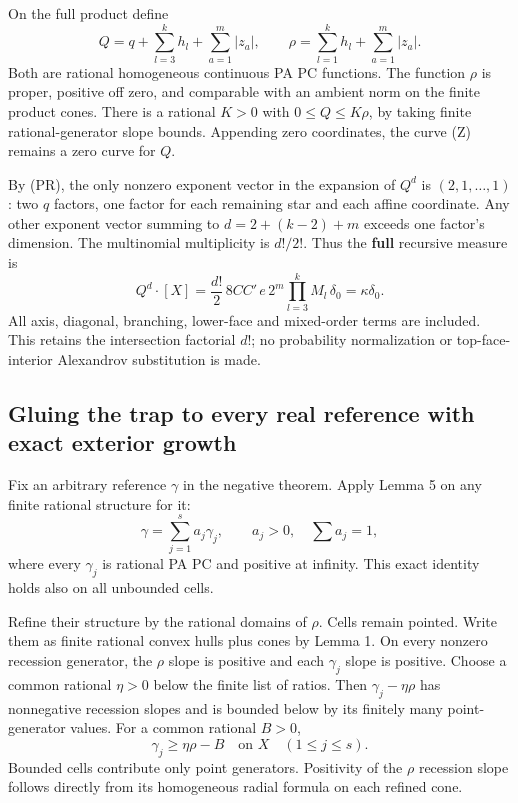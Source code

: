 \documentclass[
  11pt,
]{article}
\begin{document}
On the full product define \[
Q=q+\sum_{l=3}^kh_l+\sum_{a=1}^m|z_a|,
\qquad \rho=\sum_{l=1}^kh_l+\sum_{a=1}^m|z_a|.
\tag{Q}
\] Both are rational homogeneous continuous PA PC functions. The
function \(\rho\) is proper, positive off zero, and comparable with an
ambient norm on the finite product cones. There is a rational \(K>0\)
with \(0\leq Q\leq K\rho\), by taking finite rational-generator slope
bounds. Appending zero coordinates, the curve (Z) remains a zero curve
for \(Q\).

By (PR), the only nonzero exponent vector in the expansion of \(Q^d\) is
\((2,1,\ldots,1)\): two \(q\) factors, one factor for each remaining
star and each affine coordinate. Any other exponent vector summing to
\(d=2+(k-2)+m\) exceeds one factor's dimension. The multinomial
multiplicity is \(d!/2!\). Thus the \textbf{full} recursive measure is
\[
Q^d\cdot[X]=\frac{d!}{2}\,8CC'\,e\,2^m\prod_{l=3}^kM_l\,\delta_0
=\kappa\delta_0.
\tag{M}
\] All axis, diagonal, branching, lower-face and mixed-order terms are
included. This retains the intersection factorial \(d!\); no probability
normalization or top-face-interior Alexandrov substitution is made.

\subsection{Gluing the trap to every real reference with exact exterior
growth}\label{gluing-the-trap-to-every-real-reference-with-exact-exterior-growth}

Fix an arbitrary reference \(\gamma\) in the negative theorem. Apply
Lemma 5 on any finite rational structure for it: \[
\gamma=\sum_{j=1}^s a_j\gamma_j,\qquad a_j>0,\quad\sum a_j=1,
\] where every \(\gamma_j\) is rational PA PC and positive at infinity.
This exact identity holds also on all unbounded cells.

Refine their structure by the rational domains of \(\rho\). Cells remain
pointed. Write them as finite rational convex hulls plus cones by Lemma
1. On every nonzero recession generator, the \(\rho\) slope is positive
and each \(\gamma_j\) slope is positive. Choose a common rational
\(\eta>0\) below the finite list of ratios. Then \(\gamma_j-\eta\rho\)
has nonnegative recession slopes and is bounded below by its finitely
many point-generator values. For a common rational \(B>0\), \[
\gamma_j\geq\eta\rho-B\quad\text{on }X\quad(1\leq j\leq s).
\tag{C}
\] Bounded cells contribute only point generators. Positivity of the
\(\rho\) recession slope follows directly from its homogeneous radial
formula on each refined cone.
\end{document}
